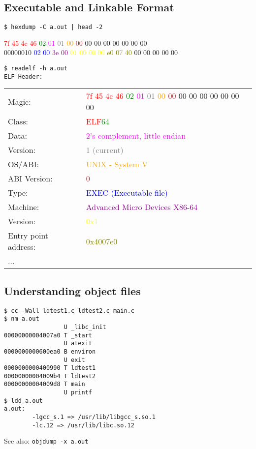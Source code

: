 \documentclass[xga]{xdvislides}
\begin{document}
\subsection{Executable and Linkable Format}
\begin{verbatim}
$ hexdump -C a.out | head -2
\end{verbatim}
  \textcolor{red}{7f 45 4c 46} \textcolor{green}{02} \textcolor{magenta}{01} \textcolor{gray}{01} \textcolor{orange}{00} \textcolor{brown}{00} 00 00 00 00 00 00 00 \\
00000010  \textcolor{blue}{02 00} \textcolor{purple}{3e 00} \textcolor{yellow}{01 00 00 00}  \textcolor{olive}{e0 07 40} 00 00 00 00 00
\begin{verbatim}
$ readelf -h a.out
ELF Header:
\end{verbatim}
\begin{tabular}{ll}
  Magic: & \textcolor{red}{7f 45 4c 46} \textcolor{green}{02} \textcolor{magenta}{01} \textcolor{gray}{01} \textcolor{orange}{00} \textcolor{brown}{00} 00 00 00 00 00 00 00 \\
  Class: & \textcolor{red}{ELF}\textcolor{green}{64} \\
  Data: & \textcolor{magenta}{2's complement, little endian} \\
  Version: & \textcolor{gray}{1 (current)} \\
  OS/ABI: & \textcolor{orange}{UNIX - System V} \\
  ABI Version: & \textcolor{brown}{0} \\
  Type: & \textcolor{blue}{EXEC (Executable file)} \\
  Machine: & \textcolor{purple}{Advanced Micro Devices X86-64} \\
  Version: & \textcolor{yellow}{0x1} \\
  Entry point address: & \textcolor{olive}{0x4007e0} \\
  ... \\
\end{tabular}
\setfontphv


\subsection{Understanding object files}
\begin{verbatim}
$ cc -Wall ldtest1.c ldtest2.c main.c
$ nm a.out
                 U _libc_init
00000000004007a0 T _start
                 U atexit
0000000000600ea0 B environ
                 U exit
0000000000400990 T ldtest1
00000000004009b4 T ldtest2
00000000004009d8 T main
                 U printf
$ ldd a.out
a.out:
        -lgcc_s.1 => /usr/lib/libgcc_s.so.1
        -lc.12 => /usr/lib/libc.so.12
\end{verbatim}
See also: \verb+objdump -x a.out+
\end{document}
